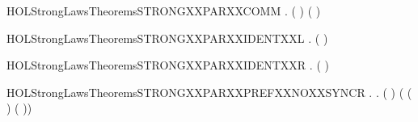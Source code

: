\newcommand{\HOLStrongLawsTheoremsSTRONGXXPARXXASSOC}{\UseVerbatim{HOLStrongLawsTheoremsSTRONGXXPARXXASSOC}}
\begin{SaveVerbatim}{HOLStrongLawsTheoremsSTRONGXXPARXXCOMM}
\HOLTokenTurnstile{} \HOLSymConst{\HOLTokenForall{}} .  ( \HOLSymConst{\ensuremath{\parallel}} ) ( \HOLSymConst{\ensuremath{\parallel}} )
\end{SaveVerbatim}
\newcommand{\HOLStrongLawsTheoremsSTRONGXXPARXXCOMM}{\UseVerbatim{HOLStrongLawsTheoremsSTRONGXXPARXXCOMM}}
\begin{SaveVerbatim}{HOLStrongLawsTheoremsSTRONGXXPARXXIDENTXXL}
\HOLTokenTurnstile{} \HOLSymConst{\HOLTokenForall{}}.  ( \HOLSymConst{\ensuremath{\parallel}} ) 
\end{SaveVerbatim}
\newcommand{\HOLStrongLawsTheoremsSTRONGXXPARXXIDENTXXL}{\UseVerbatim{HOLStrongLawsTheoremsSTRONGXXPARXXIDENTXXL}}
\begin{SaveVerbatim}{HOLStrongLawsTheoremsSTRONGXXPARXXIDENTXXR}
\HOLTokenTurnstile{} \HOLSymConst{\HOLTokenForall{}}.  ( \HOLSymConst{\ensuremath{\parallel}} ) 
\end{SaveVerbatim}
\newcommand{\HOLStrongLawsTheoremsSTRONGXXPARXXIDENTXXR}{\UseVerbatim{HOLStrongLawsTheoremsSTRONGXXPARXXIDENTXXR}}
\begin{SaveVerbatim}{HOLStrongLawsTheoremsSTRONGXXPARXXPREFXXNOXXSYNCR}
\HOLTokenTurnstile{} \HOLSymConst{\HOLTokenForall{}} .
        \HOLSymConst{\HOLTokenNotEqual{}}   \HOLSymConst{\HOLTokenImp{}}
       \HOLSymConst{\HOLTokenForall{}} .
            (  \HOLSymConst{\ensuremath{\parallel}}  )
             ( ( \HOLSymConst{\ensuremath{\parallel}}  ) \HOLSymConst{+}
               (  \HOLSymConst{\ensuremath{\parallel}} ))
\end{SaveVerbatim}
